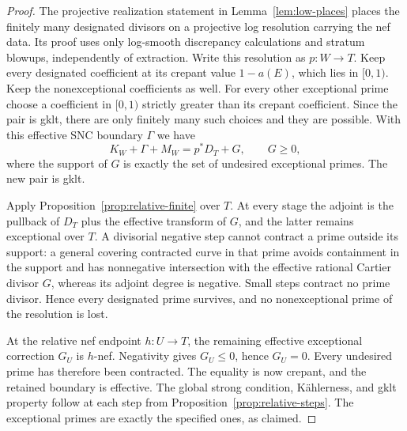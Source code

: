 \begin{proof}
The projective realization statement in Lemma~\ref{lem:low-places}
places the finitely many designated divisors on a projective log
resolution carrying the nef data.  Its proof uses only log-smooth
discrepancy calculations and stratum blowups, independently of
extraction.  Write this resolution as $p\colon W\to T$.
Keep every designated coefficient at its crepant value $1-a(E)$,
which lies in $[0,1)$.  Keep the nonexceptional coefficients as well.
For every other exceptional prime choose a coefficient in $[0,1)$
strictly greater than its crepant coefficient.  Since the pair is
gklt, there are only finitely many such choices and they are possible.
With this effective SNC boundary $\Gamma$ we have
\[
 K_W+\Gamma+M_W=p^*D_T+G,
 \qquad G\geq0,
\]
where the support of $G$ is exactly the set of undesired exceptional
primes.  The new pair is gklt.

Apply Proposition~\ref{prop:relative-finite} over $T$.  At every
stage the adjoint is the pullback of $D_T$ plus the effective
transform of $G$, and the latter remains exceptional over $T$.
A divisorial negative step cannot contract a prime outside its
support: a general covering contracted curve in that prime avoids
containment in the support and has nonnegative intersection with
the effective rational Cartier divisor $G$, whereas its adjoint
degree is negative.  Small steps contract no prime divisor.  Hence
every designated prime survives, and no nonexceptional prime of the
resolution is lost.

At the relative nef endpoint $h\colon U\to T$, the remaining
effective exceptional correction $G_U$ is $h$-nef.  Negativity gives
$G_U\leq0$, hence $G_U=0$.  Every undesired prime has therefore been
contracted.  The equality is now crepant, and the retained boundary
is effective.  The global strong condition, K\"ahlerness, and gklt
property follow at each step from Proposition~\ref{prop:relative-steps}.
The exceptional primes are exactly the specified ones, as claimed.
\end{proof}
